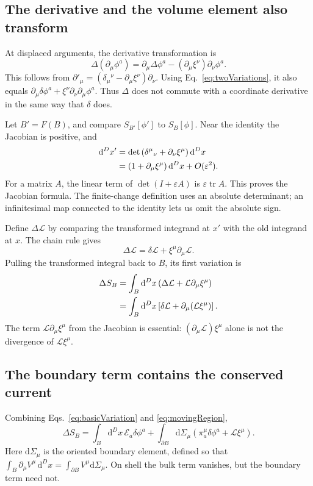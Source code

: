 \documentclass[11pt]{article}
\newcommand{\dd}{\mathrm{d}}
\newcommand{\Lag}{\mathcal{L}}
\newcommand{\Eul}{\mathcal E}
\begin{document}
\subsection{The derivative and the volume element also transform}
At displaced arguments, the derivative transformation is
\begin{equation}
\Delta(\partial_\mu\phi^a)
=\partial_\mu\Delta\phi^a
 -(\partial_\mu\xi^\nu)\partial_\nu\phi^a.
\label{eq:derivativeVariation}
\end{equation}
This follows from
\(\partial'_\mu=(\delta_\mu{}^\nu-\partial_\mu\xi^\nu)\partial_\nu\).
Using Eq.~\eqref{eq:twoVariations}, it also equals
\(\partial_\mu\delta\phi^a+\xi^\nu\partial_\nu\partial_\mu\phi^a\).
Thus \(\Delta\) does not commute with a coordinate derivative in the same
way that \(\delta\) does.

Let \(B'=F(B)\), and compare \(S_{B'}[\phi']\) to \(S_B[\phi]\).
Near the identity the Jacobian is positive, and
\begin{align}
\dd^D x'&=\det\left(\delta^\mu{}_{\nu}+\partial_\nu\xi^\mu\right)
\dd^D x\notag\\
&=\left(1+\partial_\mu\xi^\mu\right)\dd^D x+O(\varepsilon^2).
\label{eq:Jacobian}
\end{align}
For a matrix \(A\), the linear term of \(\det(I+\varepsilon A)\) is
\(\varepsilon\operatorname{tr}A\). This proves the Jacobian formula.
The finite-change definition uses an absolute determinant; an
infinitesimal map connected to the identity lets us omit the absolute sign.

Define \(\Delta\Lag\) by comparing the transformed integrand at \(x'\)
with the old integrand at \(x\). The chain rule gives
\begin{equation}
\Delta\Lag=\delta\Lag+\xi^\mu\partial_\mu\Lag.
\end{equation}
Pulling the transformed integral back to \(B\), its first variation is
\begin{align}
\Delta S_B
&=\int_B\dd^D x\left(\Delta\Lag+\Lag\partial_\mu\xi^\mu\right)\notag\\
&=\int_B\dd^D x\left[\delta\Lag+
\partial_\mu(\Lag\xi^\mu)\right].
\label{eq:movingRegion}
\end{align}
The term \(\Lag\partial_\mu\xi^\mu\) from the Jacobian is essential:
\((\partial_\mu\Lag)\xi^\mu\) alone is not the divergence of
\(\Lag\xi^\mu\).

\subsection{The boundary term contains the conserved current}
Combining Eqs.~\eqref{eq:basicVariation} and \eqref{eq:movingRegion},
\begin{equation}
\boxed{\Delta S_B=\int_B\dd^D x\,\Eul_a\delta\phi^a
+\int_{\partial B}\dd\Sigma_\mu
\left(\pi_a^\mu\delta\phi^a+\Lag\xi^\mu\right).}
\label{eq:master}
\end{equation}
Here \(\dd\Sigma_\mu\) is the oriented boundary element, defined so that
\(\int_B\partial_\mu V^\mu\,\dd^D x=
\int_{\partial B}V^\mu\dd\Sigma_\mu\).
On shell the bulk term vanishes, but the boundary term need not.
\end{document}
